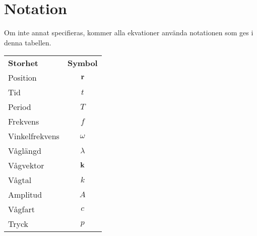 \section{Notation}
Om inte annat specifieras, kommer alla ekvationer använda notationen som ges i denna tabellen.

\begin{table}[!h]
	\centering
	\begin{tabular}{| l | c |}
		\hline
		\textbf{Storhet} & \multicolumn{1}{|l|}{\textbf{Symbol}}\\
		Position         & $\vect{r}$ \\
		\hline
		Tid              & $t$ \\
		\hline
		Period           & $T$ \\
		\hline
		Frekvens         & $f$ \\
		\hline
		Vinkelfrekvens   & $\omega$ \\
		\hline
		Våglängd         & $\lambda$ \\
		\hline
		Vågvektor        & $\vect{k}$ \\
		\hline
		Vågtal           & $k$ \\
		\hline
		Amplitud         & $A$ \\
		\hline
		Vågfart          & $c$ \\
		\hline
		Tryck            & $p$ \\
		\hline
	\end{tabular}
\end{table}

